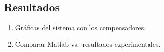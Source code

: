 \subsection{Resultados}
\begin{enumerate}[label=5.\arabic*.]
	\item Gráficas del sistema con los compensadores.
	\item Comparar Matlab vs.\ resultados experimentales.
\end{enumerate}



\balance